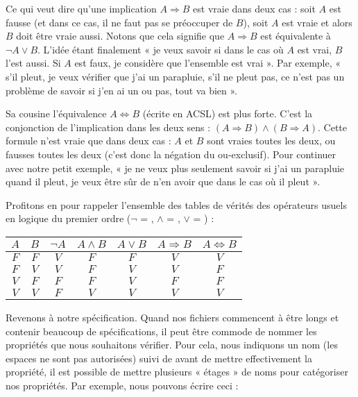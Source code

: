 Ce qui veut dire qu'une implication $A \Rightarrow B$ est vraie dans deux cas : 
soit $A$ est fausse (et dans ce cas, il ne faut pas se préoccuper de $B$), soit 
$A$ est vraie et alors $B$ doit être vraie aussi. Notons que cela signifie que
$A \Rightarrow B$ est équivalente à $\neg A \vee B$. L'idée étant finalement
« je veux savoir si dans le cas où $A$ est vrai, $B$ l'est aussi. Si $A$ est
faux, je considère que l'ensemble est vrai ». Par exemple, « s'il pleut, je veux
vérifier que j'ai un parapluie, s'il ne pleut pas, ce n'est pas un problème
de savoir si j'en ai un ou pas, tout va bien ».



Sa cousine l'équivalence $A \Leftrightarrow B$ (écrite  en ACSL)
est plus forte. C'est la conjonction de l'implication dans les deux sens :
$(A \Rightarrow B) \wedge (B \Rightarrow A)$. Cette formule n'est vraie que
dans deux cas : $A$ et $B$ sont vraies toutes les deux, ou fausses 
toutes les deux (c'est donc la négation du ou-exclusif). Pour continuer avec
notre petit exemple, « je ne veux plus seulement savoir si j'ai un parapluie
quand il pleut, je veux être sûr de n'en avoir que dans le cas où il pleut ».



\begin{Information}
Profitons en pour rappeler l'ensemble des tables de vérités des opérateurs
usuels en logique du premier ordre ($\neg$ = \CodeInline{!}, $\wedge$ = \CodeInline{\&\&},
$\vee$ = \CodeInline{||}) :

\begin{longtabu}{|c|c|c|c|c|c|c|} \hline
$A$ & $B$ & $\neg A$ & $A \wedge B$ & $A \vee B$ & $A \Rightarrow B$ & $A \Leftrightarrow B$ \\ \hline
$F$ & $F$ & $V$ & $F$ & $F$ & $V$ & $V$ \\ \hline
$F$ & $V$ & $V$ & $F$ & $V$ & $V$ & $F$ \\ \hline
$V$ & $F$ & $F$ & $F$ & $V$ & $F$ & $F$ \\ \hline
$V$ & $V$ & $F$ & $V$ & $V$ & $V$ & $V$ \\ \hline
\end{longtabu}
\end{Information}


Revenons à notre spécification. Quand nos fichiers commencent à être longs et 
contenir beaucoup de spécifications, il peut être commode de nommer les 
propriétés que nous souhaitons vérifier. Pour cela, nous indiquons un nom (les 
espaces ne sont pas autorisées) suivi de \CodeInline{:} avant de mettre effectivement
la propriété, il est possible de mettre plusieurs « étages » de noms pour 
catégoriser nos propriétés. Par exemple, nous pouvons écrire ceci :



